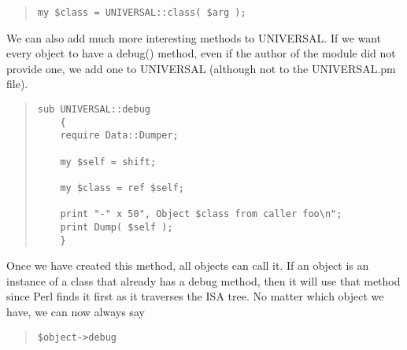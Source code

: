 \begin{quote}
\begin{verbatim}
my $class = UNIVERSAL::class( $arg );
\end{verbatim}
\end{quote}

We can also add much more interesting methods to UNIVERSAL.  If
we want every object to have a debug() method, even if the 
author of the module did not provide one, we add one to UNIVERSAL
(although not to the UNIVERSAL.pm file).

\begin{quote}
\begin{verbatim}
sub UNIVERSAL::debug
    {
    require Data::Dumper;
    
    my $self = shift;
    
    my $class = ref $self;
    
    print "-" x 50", Object $class from caller foo\n";
    print Dump( $self );
    }
\end{verbatim}
\end{quote}    

Once we have created this method, all objects can call it.  If an object
is an instance of a class that already has a debug method, then it will use 
that method since Perl finds it first as it traverses the ISA tree.
No matter which object we have, we can now always say

\begin{quote}
\begin{verbatim}
$object->debug
\end{verbatim}
\end{quote}    

 
